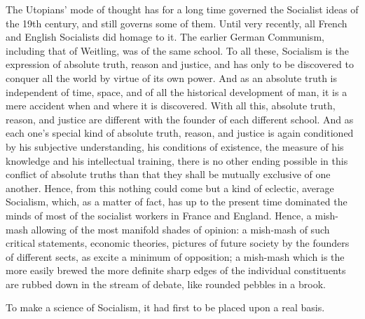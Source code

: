 The Utopians' mode of thought has for a long time governed the Socialist ideas
of the 19th century, and still governs some of them. Until very recently, all
French and English Socialists did homage to it. The earlier German Communism,
including that of Weitling, was of the same school. To all these, Socialism is
the expression of absolute truth, reason and justice, and has only to be
discovered to conquer all the world by virtue of its own power. And as an
absolute truth is independent of time, space, and of all the historical
development of man, it is a mere accident when and where it is discovered. With
all this, absolute truth, reason, and justice are different with the founder of
each different school. And as each one's special kind of absolute truth, reason,
and justice is again conditioned by his subjective understanding, his conditions
of existence, the measure of his knowledge and his intellectual training, there
is no other ending possible in this conflict of absolute truths than that they
shall be mutually exclusive of one another. Hence, from this nothing could come
but a kind of eclectic, average Socialism, which, as a matter of fact, has up to
the present time dominated the minds of most of the socialist workers in France
and England. Hence, a mish-mash allowing of the most manifold shades of opinion:
a mish-mash of such critical statements, economic theories, pictures of future
society by the founders of different sects, as excite a minimum of opposition;
a mish-mash which is the more easily brewed the more definite sharp edges of the
individual constituents are rubbed down in the stream of debate, like rounded
pebbles in a brook.

To make a science of Socialism, it had first to be placed upon a real basis.

\printendnotes
